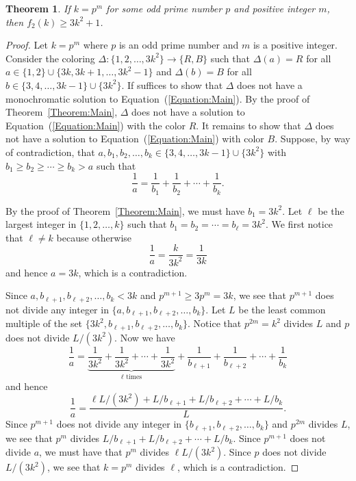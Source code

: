 \documentclass[11pt]{article}
\newtheorem{theorem}{Theorem}[section]
\theoremstyle{definition}
\begin{document}
\begin{theorem}\label{Theorem:2-ColorPrimePowers}
    If $k=p^m$ for some odd prime number $p$ and positive integer $m$, then $f_2(k)\geq3k^2+1$.
\end{theorem}
\begin{proof}
Let $k=p^m$ where $p$ is an odd prime number and $m$ is a positive integer. Consider the coloring $\Delta:\{1,2,\ldots,3k^2\}\to\{R,B\}$ such that $\Delta(a)=R$ for all $a\in \{1,2\}\cup\{3k,3k+1,\ldots,3k^2-1\}$ and $\Delta(b)=B$ for all $b\in \{3,4,\ldots,3k-1\}\cup\{3k^2\}$. If suffices to show that $\Delta$ does not have a monochromatic solution to Equation~(\ref{Equation:Main}). By the proof of Theorem~\ref{Theorem:Main}, $\Delta$ does not have a solution to Equation~(\ref{Equation:Main}) with the color $R$. It remains to show that $\Delta$ does not have a solution to Equation~(\ref{Equation:Main}) with color $B$. Suppose, by way of contradiction, that $a,b_1,b_2,\ldots,b_k\in\{3,4,\ldots,3k-1\}\cup\{3k^2\}$ with $b_1\geq b_2\geq\cdots\geq b_k>a$ such that
\[
\frac{1}{a}=\frac{1}{b_1}+\frac{1}{b_2}+\cdots+\frac{1}{b_k}.
\]

By the proof of Theorem~\ref{Theorem:Main}, we must have $b_1=3k^2$. Let $\ell$ be the largest integer in $\{1,2,\ldots,k\}$ such that $b_1=b_2=\cdots=b_\ell=3k^2$. We first notice that $\ell\neq k$ because otherwise
\[
\frac{1}{a}=\frac{k}{3k^2}=\frac{1}{3k}
\]
and hence $a=3k$, which is a contradiction.

Since $a,b_{\ell+1},b_{\ell+2},\ldots,b_{k}<3k$ and $p^{m+1}\geq 3p^m=3k$, we see that $p^{m+1}$ does not divide any integer in $\{a,b_{\ell+1},b_{\ell+2},\ldots,b_{k}\}$. Let $L$ be the least common multiple of the set $\{3k^2,b_{\ell+1},b_{\ell+2},\ldots,b_k\}$. Notice that $p^{2m}=k^2$ divides $L$ and $p$ does not divide $L/(3k^2)$. Now we have
\[
\frac{1}{a}=\underbrace{\frac{1}{3k^2}+\frac{1}{3k^2}+\cdots+\frac{1}{3k^2}}_{\ell\text{ times}}+\frac{1}{b_{\ell+1}}+\frac{1}{b_{\ell+2}}+\cdots+\frac{1}{b_k}
\]
and hence
\[
\frac{1}{a}=\frac{\ell L/(3k^2)+L/b_{\ell+1}+L/b_{\ell+2}+\cdots+L/b_k}{L}.
\]
Since $p^{m+1}$ does not divide any integer in $\{b_{\ell+1},b_{\ell+2},\ldots,b_{k}\}$ and $p^{2m}$ divides $L$, we see that $p^m$ divides $L/b_{\ell+1}+L/b_{\ell+2}+\cdots+L/b_k$. Since $p^{m+1}$ does not divide $a$, we must have that $p^m$ divides $\ell L/(3k^2)$. Since $p$ does not divide $L/(3k^2)$, we see that $k=p^m$ divides $\ell$, which is a contradiction.
\end{proof}
\end{document}
